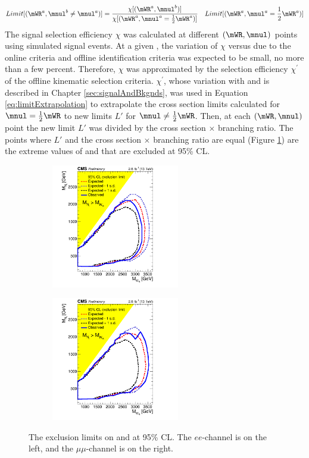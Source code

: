 \begin{equation}
	Limit[(\mWR^{a}, \mnul^{b} \neq \mnul^{a})] = \frac{\chi[(\mWR^{a}, \mnul^{b})]}{\chi[(\mWR^{a}, \mnul^{a} = \frac{1}{2}\mWR^{a})]} \quad Limit[(\mWR^{a}, \mnul^{a} = \frac{1}{2}\mWR^{a})]
\label{eq:limitExtrapolation}
\end{equation}
The signal selection efficiency $\chi$ was calculated at different $(\mWR,\mnul)$ points using simulated signal events.  At a given 
\mWR, the variation of $\chi$ versus \mnul due to the online criteria and offline identification criteria was expected to be small, no 
more than a few percent.  Therefore, $\chi$ was approximated by the selection efficiency $\chi^'$ of the offline kinematic selection 
criteria.  $\chi^'$, whose variation with \mWR and \mnul is described in Chapter \ref{sec:signalAndBkgnds}, was used in Equation 
\ref{eq:limitExtrapolation} to extrapolate the cross section limits calculated for $\mnul = \frac{1}{2}\mWR$ to new limits $L'$ for 
$\mnul \neq \frac{1}{2}\mWR$.  Then, at each $(\mWR,\mnul)$ point the new limit $L'$ was divided by the cross section $\times$ branching 
ratio.  The points where $L'$ and the cross section $\times$ branching ratio are equal (Figure \ref{fig:twoDimLimits}) are the extreme 
values of \mnul and \mWR that are excluded at 95\% CL.

\begin{figure}
	\centering
	\begin{subfigure}[t]{2.2in}
		\centering
		\includegraphics[width=2.2in]{figures/lim2dWReejj_SHv19700toysAprilTwentyThree_exclusionOverlayWithExpPlusMinusOneSigma.png}
	\end{subfigure}
	\thickspace
	\begin{subfigure}[t]{2.2in}
		\centering
		\includegraphics[width=2.2in]{figures/lim2dWRmumujj_SHv19700toysAprilTwentyThree_exclusionOverlayWithExpPlusMinusOneSigma.png}
	\end{subfigure}
	\caption{The exclusion limits on \mWR and \mnul at 95\% CL.  The $ee$-channel is on the left, and the $\mu\mu$-channel is on 
	the right.}
	\label{fig:twoDimLimits}
\end{figure}

